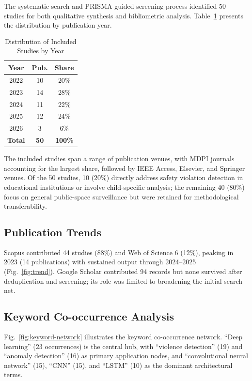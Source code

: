 \documentclass[conference]{IEEEtran}
\begin{document}
The systematic search and PRISMA-guided screening process identified 50 studies for both qualitative synthesis and bibliometric analysis. Table~\ref{tab:years} presents the distribution by publication year.

\begin{table}[t]
\caption{Distribution of Included Studies by Year}
\begin{center}
\renewcommand{\arraystretch}{1.0}
\begin{tabular}{|c|c|c|}
\hline
\textbf{Year} & \textbf{Pub.} & \textbf{Share} \\
\hline
2022 & 10 & 20\% \\
2023 & 14 & 28\% \\
2024 & 11 & 22\% \\
2025 & 12 & 24\% \\
2026 & 3 & 6\% \\
\hline
\textbf{Total} & \textbf{50} & \textbf{100\%} \\
\hline
\end{tabular}
\label{tab:years}
\end{center}
\end{table}

The included studies span a range of publication venues, with MDPI journals accounting for the largest share, followed by IEEE Access, Elsevier, and Springer venues. Of the 50 studies, 10 (20\%) directly address safety violation detection in educational institutions or involve child-specific analysis; the remaining 40 (80\%) focus on general public-space surveillance but were retained for methodological transferability.

\subsection{Publication Trends}

Scopus contributed 44 studies (88\%) and Web of Science 6 (12\%), peaking in 2023 (14 publications) with sustained output through 2024--2025 (Fig.~\ref{fig:trend}). Google Scholar contributed 94 records but none survived after deduplication and screening; its role was limited to broadening the initial search net.

\subsection{Keyword Co-occurrence Analysis}

Fig.~\ref{fig:keyword-network} illustrates the keyword co-occurrence network. ``Deep learning'' (23 occurrences) is the central hub, with ``violence detection'' (19) and ``anomaly detection'' (16) as primary application nodes, and ``convolutional neural network'' (15), ``CNN'' (15), and ``LSTM'' (10) as the dominant architectural terms.
\end{document}
